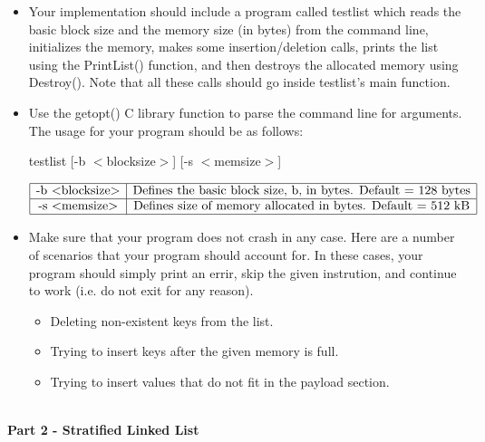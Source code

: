 \documentclass[12pt]{extarticle}
\newenvironment{myindentpar}[1]%
 {\begin{list}{}%
         {\setlength{\leftmargin}{#1}}%
         \item[]%
 }
 {\end{list}}
\begin{document}
\begin{myindentpar}{6.5mm}
\begin{itemize}
    \item Your implementation should include a program called testlist which reads the basic block size and the memory size (in bytes) from the command line, initializes the memory, makes some insertion/deletion calls, prints the list using the PrintList() function, and then destroys the allocated memory using Destroy().  Note that all these calls should go inside testlist's main function.  
    \item Use the getopt() C library function to parse the command line for arguments.  The usage for your program should be as follows:
    \begin{center}
        testlist [-b $<$blocksize$>$] [-s $<$memsize$>$]
    \end{center}
    
    \vspace{-5mm}
    \begin{displaymath}
        \begin{array}{|c|c|}
            \hline
            \text{-b $<$blocksize$>$} & \text{Defines the basic block size, b, in bytes.  Default = 128 bytes} \\
            \hline
            \text{-s $<$memsize$>$} & \text{Defines size of memory allocated in bytes.  Default = 512 kB} \\
            \hline
        \end{array}
    \end{displaymath}
    
    \item Make sure that your program does not crash in any case.  Here are a number of scenarios that your program should account for.  In these cases, your program should simply print an errir, skip the given instrution, and continue to work (i.e. do not exit for any reason).  
    \begin{itemize}
        \setlength\itemsep{-0.1em}
    
        \item Deleting non-existent keys from the list.  
        \item Trying to insert keys after the given memory is full.  
        \item Trying to insert values that do not fit in the payload section.  
        
    \end{itemize}
    
    \end{itemize}

    \ \\
    \textbf{Part 2 - Stratified Linked List}
    

\end{myindentpar}
\end{document}
